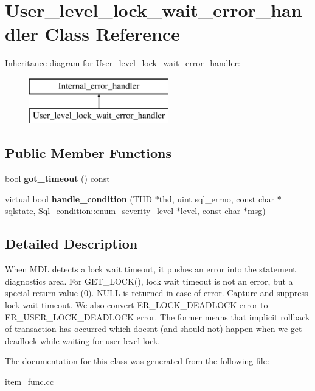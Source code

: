 \hypertarget{classUser__level__lock__wait__error__handler}{}\section{User\+\_\+level\+\_\+lock\+\_\+wait\+\_\+error\+\_\+handler Class Reference}
\label{classUser__level__lock__wait__error__handler}
Inheritance diagram for User\+\_\+level\+\_\+lock\+\_\+wait\+\_\+error\+\_\+handler\+:\begin{figure}[H]
\begin{center}
\leavevmode
\includegraphics[height=2.000000cm]{classUser__level__lock__wait__error__handler}
\end{center}
\end{figure}
\subsection*{Public Member Functions}
\begin{DoxyCompactItemize}
\item 
\mbox{\label{classUser__level__lock__wait__error__handler_a791279e2711325db4f0dc79a541aacb6}} 
bool {\bfseries got\+\_\+timeout} () const
\item 
\mbox{\label{classUser__level__lock__wait__error__handler_a12e41d5a6b87f6eb47f689c76e2f5052}} 
virtual bool {\bfseries handle\+\_\+condition} (T\+HD $\ast$thd, uint sql\+\_\+errno, const char $\ast$sqlstate, \mbox{\hyperlink{classSql__condition_ab0602581e19cddb609bfe10c44be4e83}{Sql\+\_\+condition\+::enum\+\_\+severity\+\_\+level}} $\ast$level, const char $\ast$msg)
\end{DoxyCompactItemize}


\subsection{Detailed Description}
When M\+DL detects a lock wait timeout, it pushes an error into the statement diagnostics area. For G\+E\+T\+\_\+\+L\+O\+C\+K(), lock wait timeout is not an error, but a special return value (0). N\+U\+LL is returned in case of error. Capture and suppress lock wait timeout. We also convert E\+R\+\_\+\+L\+O\+C\+K\+\_\+\+D\+E\+A\+D\+L\+O\+CK error to E\+R\+\_\+\+U\+S\+E\+R\+\_\+\+L\+O\+C\+K\+\_\+\+D\+E\+A\+D\+L\+O\+CK error. The former means that implicit rollback of transaction has occurred which doesn\textquotesingle{}t (and should not) happen when we get deadlock while waiting for user-\/level lock. 

The documentation for this class was generated from the following file\+:\begin{DoxyCompactItemize}
\item 
\mbox{\hyperlink{item__func_8cc}{item\+\_\+func.\+cc}}\end{DoxyCompactItemize}
